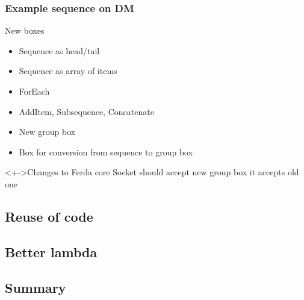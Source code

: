 \documentclass{beamer}
\begin{document}
\begin{frame}
	\frametitle{Example sequence on DM}
	\begin{block}{New boxes}
		\begin{itemize}[<+->]
			\item Sequence as head/tail
			\item Sequence as array of items
			\item ForEach
			\item AddItem, Subsequence, Concatenate
			\item New group box
			\item Box for conversion from sequence to group box
		\end{itemize}	
	\end{block}
	\begin{block}<+->{Changes to Ferda core}
		\pause Socket should accept new group box it accepts old one
	\end{block}
\end{frame}
\subsection{Reuse of code}

\subsection{Better lambda}

\subsection{Summary}
\end{document}
